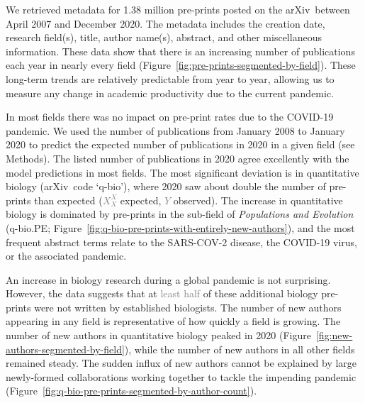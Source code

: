 \documentclass{nature}
\newcommand{\todo}[1]{\textcolor{gray}{#1}}
\newcommand{\arxiv}{arXiv}
\begin{document}
We retrieved metadata for 1.38 million pre-prints posted on the \arxiv\ between April 2007 and December 2020. The metadata includes the creation date, research field(s), title, author name(s), abstract, and other miscellaneous information. These data show that there is an increasing number of publications each year in nearly every field  (Figure~\ref{fig:pre-prints-segmented-by-field}). These long-term trends are relatively predictable from year to year, allowing us to measure any change in academic productivity due to the current pandemic.


In most fields there was no impact on pre-print rates due to the COVID-19 pandemic. We used the number of publications from January 2008 to January 2020 to predict the expected number of publications in 2020 in a given field (see Methods). The listed number of publications in 2020 agree excellently with the model predictions in most fields. The most significant deviation is in quantitative biology (\arxiv\ code `q-bio'), where 2020 saw about double the number of pre-prints than expected (\todo{$X^{X}_{X}$} expected, \todo{$Y$} observed). The increase in quantitative biology is dominated by  pre-prints in the sub-field of \emph{Populations and Evolution} (q-bio.PE; Figure~\ref{fig:q-bio-pre-prints-with-entirely-new-authors}), and the most frequent abstract terms relate to the SARS-COV-2 disease, the COVID-19 virus, or the associated pandemic.


An increase in biology research during a global pandemic is not surprising. However, the data suggests that at \todo{least half} of these additional biology pre-prints were not written by established biologists. The number of new authors appearing in any field is representative of how quickly a field is growing. The number of new authors in quantitative biology peaked in 2020 (Figure~\ref{fig:new-authors-segmented-by-field}), while the number of new authors in all other fields remained steady. The sudden influx of new authors cannot be explained by large newly-formed collaborations working together to tackle the impending pandemic (Figure~\ref{fig:q-bio-pre-prints-segmented-by-author-count}). 
\end{document}
